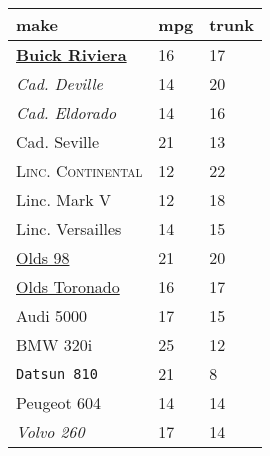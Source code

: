 \documentclass{article}
\begin{document}
\begin{table}[tbp] \centering
{}

\begin{tabularx}{\linewidth}{lCC}

\toprule
{make}&{mpg}&{trunk} \tabularnewline
\midrule \addlinespace[\belowrulesep]
\underline{\textbf{Buick Riviera}}&16&17 \tabularnewline
\textsl{Cad. Deville}&14&20 \tabularnewline
\textit{Cad. Eldorado}&14&16 \tabularnewline
Cad. Seville&21&13 \tabularnewline
\textsc{Linc. Continental}&12&22 \tabularnewline
\textsf{Linc. Mark V}&12&18 \tabularnewline
Linc. Versailles&14&15 \tabularnewline
\underline{Olds 98}&21&20 \tabularnewline
\underline{Olds Toronado}&16&17 \tabularnewline
Audi 5000&17&15 \tabularnewline
BMW 320i&25&12 \tabularnewline
\texttt{Datsun 810}&21&8 \tabularnewline
Peugeot 604&14&14 \tabularnewline
\emph{Volvo 260}&17&14 \tabularnewline
\bottomrule 

\end{tabularx}
\end{table}
\end{document}
